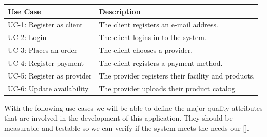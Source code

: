 \begin{table}[H]
    \begin{tabularx}{\textwidth}{lX}
    \toprule
    Use Case & Description  \\
    \midrule
    UC-1: Register as \gls{client} & The \gls{client} registers an e-mail address.\\
    UC-2: Login & The \gls{client} logins in to the system. \\
    UC-3: Places an order & The \gls{client} chooses a \gls{provider}. \\
    UC-4: Register payment & The \gls{client} registers a payment method. \\
    UC-5: Register as \gls{provider} & The \gls{provider} registers their facility and products. \\
    UC-6: Update availability & The \gls{provider} uploads their product catalog. \\
    \bottomrule
    \end{tabularx}
    \label{table_use_case}
\end{table}

With the following use cases we will  be able to define the major quality attributes that are involved in the 
development of this application. They should be measurable and testable so we can verify if the system meets 
the needs our  [\cite{refbook:DSHC}].

